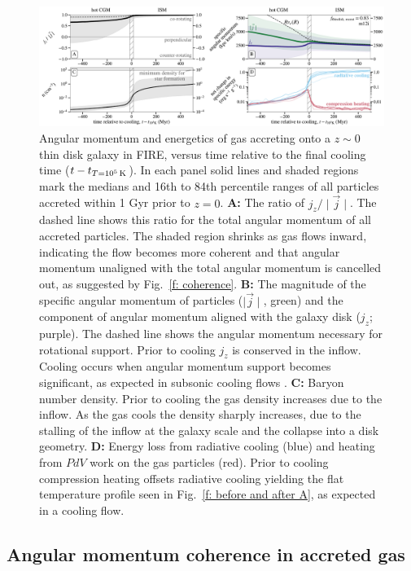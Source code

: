 \documentclass[fleqn,usenatbib]{mnras}
\newcommand{\tcon}{t_{T=10^5\,{\rm K}}}
\begin{document}
\begin{figure}
\includegraphics[width=\textwidth]{figures/before_and_after/before_and_after_m12i_md.pdf}
\caption{
Angular momentum and energetics of gas accreting onto a $z\sim0$ thin disk galaxy in FIRE, versus time relative to the final cooling time ($t - \tcon$).
In each panel solid lines and shaded regions mark the medians and 16th to 84th percentile ranges of all particles accreted within 1 Gyr prior to $z=0$.
\textbf{A:}
The ratio of $j_z / \mid \vec j \mid$. The dashed line shows this ratio for the total angular momentum of all accreted particles.
The shaded region shrinks as gas flows inward, indicating the flow becomes more coherent and that angular momentum unaligned with the total angular momentum is cancelled out, as suggested by Fig.~\ref{f: coherence}. 
\textbf{B:}
The magnitude of the specific angular momentum of particles ($\mid\vec{j}\mid$, green) and the component of angular momentum aligned with the galaxy disk ($j_z$; purple).
The dashed line shows the angular momentum necessary for rotational support.
Prior to cooling $j_z$ is conserved in the inflow. Cooling occurs when angular momentum support becomes significant, as expected in subsonic cooling flows \citep{Cowie1980, Stern2020a}.
\textbf{C:}
Baryon number density.
Prior to cooling the gas density increases due to the inflow. As the gas cools the density sharply increases, due to the stalling of the inflow at the galaxy scale and the collapse into a disk geometry. 
\textbf{D:}
Energy loss from radiative cooling (blue) and heating from $PdV$ work on the gas particles (red).
Prior to cooling compression heating offsets radiative cooling yielding the flat temperature profile seen in Fig.~\ref{f: before and after A}, as expected in a cooling flow. 
}
\label{f: before and after B}
\end{figure}




\subsection{Angular momentum coherence in accreted gas}
\label{s: mechanics -- coherence}
\end{document}
